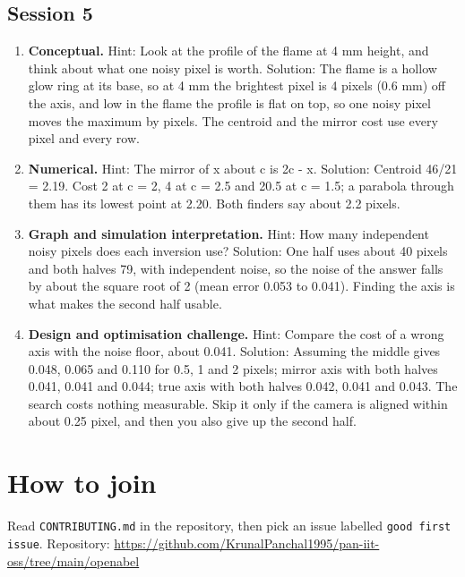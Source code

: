 \documentclass[11pt,a4paper]{article}
\begin{document}
\subsection*{Session 5}
\begin{enumerate}[nosep]
\item \textbf{Conceptual.} Hint: Look at the profile of the flame at 4 mm height, and think about what one noisy pixel is worth. Solution: The flame is a hollow glow ring at its base, so at 4 mm the brightest pixel is 4 pixels (0.6 mm) off the axis, and low in the flame the profile is flat on top, so one noisy pixel moves the maximum by pixels. The centroid and the mirror cost use every pixel and every row.
\item \textbf{Numerical.} Hint: The mirror of x about c is 2c - x. Solution: Centroid 46/21 = 2.19. Cost 2 at c = 2, 4 at c = 2.5 and 20.5 at c = 1.5; a parabola through them has its lowest point at 2.20. Both finders say about 2.2 pixels.
\item \textbf{Graph and simulation interpretation.} Hint: How many independent noisy pixels does each inversion use? Solution: One half uses about 40 pixels and both halves 79, with independent noise, so the noise of the answer falls by about the square root of 2 (mean error 0.053 to 0.041). Finding the axis is what makes the second half usable.
\item \textbf{Design and optimisation challenge.} Hint: Compare the cost of a wrong axis with the noise floor, about 0.041. Solution: Assuming the middle gives 0.048, 0.065 and 0.110 for 0.5, 1 and 2 pixels; mirror axis with both halves 0.041, 0.041 and 0.044; true axis with both halves 0.042, 0.041 and 0.043. The search costs nothing measurable. Skip it only if the camera is aligned within about 0.25 pixel, and then you also give up the second half.
\end{enumerate}

\section{How to join}
Read \texttt{CONTRIBUTING.md} in the repository, then pick an issue labelled \texttt{good first issue}. Repository: \url{https://github.com/KrunalPanchal1995/pan-iit-oss/tree/main/openabel}
\end{document}
